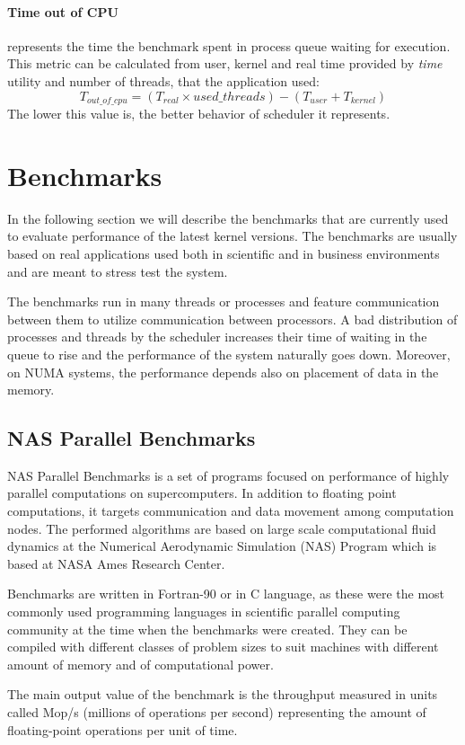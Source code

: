 \paragraph{Time out of CPU} represents the time the benchmark spent in process
queue waiting for execution. This metric can be calculated from user, kernel and
real time provided by \emph{time} utility and number of threads, that the
application used:
$$T_{out\_of\_cpu} = (T_{real} \times used\_threads) - (T_{user} + T_{kernel})$$
The lower this value is, the better behavior of scheduler it represents.

\section{Benchmarks}
In the following section we will describe the benchmarks that are currently used
to evaluate performance of the latest kernel versions. The benchmarks are
usually based on real applications used both in scientific and in business
environments and are meant to stress test the system.

The benchmarks run in many threads or processes and feature communication
between them to utilize communication between processors. A bad distribution of
processes and threads by the scheduler increases their time of waiting in the
queue to rise and the performance of the system naturally goes down. Moreover,
on NUMA systems, the performance depends also on placement of data in the
memory.

\subsection{NAS Parallel Benchmarks}
NAS Parallel Benchmarks\;\cite{nas-parallel} is a set of programs focused on
performance of highly parallel computations on supercomputers. In addition to
floating point computations, it targets communication and data movement among
computation nodes. The performed algorithms are based on large scale
computational fluid dynamics at the Numerical Aerodynamic Simulation (NAS)
Program which is based at NASA Ames Research Center.

Benchmarks are written in Fortran-90 or in C language, as these were the most
commonly used programming languages in scientific parallel computing community
at the time when the benchmarks were created. They can be compiled with
different classes of problem sizes to suit machines with different amount of
memory and of computational power.

The main output value of the benchmark is the throughput measured in units
called Mop/s (millions of operations per second) representing the amount of
floating-point operations per unit of time.

